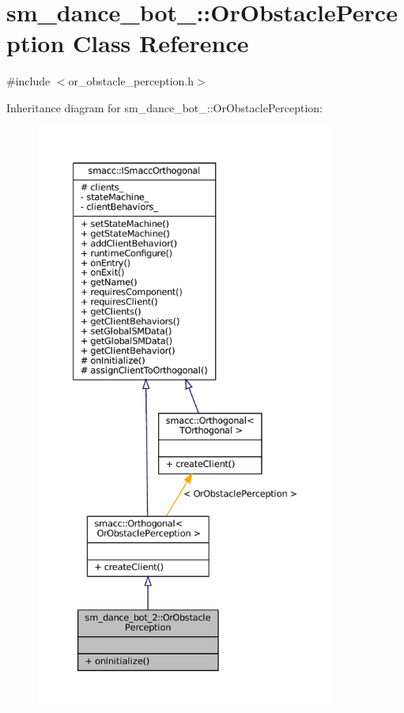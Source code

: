 \hypertarget{classsm__dance__bot__2_1_1OrObstaclePerception}{}\section{sm\+\_\+dance\+\_\+bot\+\_\+:\+:Or\+Obstacle\+Perception Class Reference}
\label{classsm__dance__bot__2_1_1OrObstaclePerception}


{\ttfamily \#include $<$or\+\_\+obstacle\+\_\+perception.\+h$>$}



Inheritance diagram for sm\+\_\+dance\+\_\+bot\+\_\+:\+:Or\+Obstacle\+Perception\+:
\nopagebreak
\begin{figure}[H]
\begin{center}
\leavevmode
\includegraphics[height=550pt]{classsm__dance__bot__2_1_1OrObstaclePerception__inherit__graph}
\end{center}
\end{figure}


